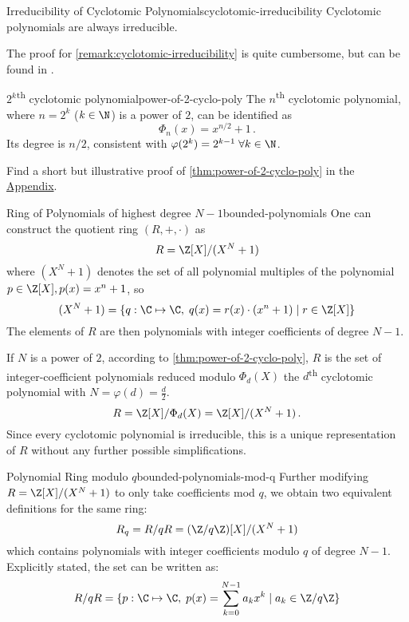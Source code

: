 \begin{remark}{Irreducibility of Cyclotomic Polynomials}{cyclotomic-irreducibility}
  Cyclotomic polynomials are always irreducible.
\end{remark}
The proof for \autoref{remark:cyclotomic-irreducibility} is quite cumbersome, but can be found in \cite{2002-serge-algebra}.

\begin{theorem}{$2^k$\textsuperscript{th} cyclotomic polynomial}{power-of-2-cyclo-poly}
  The $n$\textsuperscript{th} cyclotomic polynomial, where $n = 2^k$ ($k \in \N$) is a power of $2$,
  can be identified as
  $$\Phi_{n}(x) = x^{n/2} + 1\,.$$
  Its degree is $n/2$, consistent with $\varphi(2^k) = 2^{k-1} \; \forall k \in \N$.
\end{theorem}
Find a short but illustrative proof of \autoref{thm:power-of-2-cyclo-poly} in the \hyperref[chap:appendix]{Appendix}.

\begin{definition}{Ring of Polynomials of highest degree $N-1$}{bounded-polynomials}
  One can construct the quotient ring $(R, +, \cdot)$ as
  $$R = \Z[X] / (X^N + 1)$$
  where $(X^N + 1)$ denotes the set of all polynomial multiples of the polynomial $p \in \Z[X], p(x) = x^n + 1$, so
  $$(X^N+1) = \{q: \C \mapsto \C,\; q(x) = r(x) \cdot (x^n+1) \;|\; r \in \Z[X]\}$$
  The elements of $R$ are then polynomials with integer coefficients of degree $N-1$.
\end{definition}

If $N$ is a power of $2$, according to \autoref{thm:power-of-2-cyclo-poly},
$R$ is the set of integer-coefficient polynomials reduced modulo $\Phi_d(X)$
the $d$\textsuperscript{th} cyclotomic polynomial with $N = \varphi(d) = \frac{d}{2}$.
$$R = \Z[X] / \Phi_d(X) = \Z[X] / (X^N + 1)\,.$$
Since every cyclotomic polynomial is irreducible, this is a unique representation of $R$
without any further possible simplifications.

\begin{corollary}{Polynomial Ring modulo $q$}{bounded-polynomials-mod-q}
  Further modifying $R = \Z[X] / (X^N+1)$ to only take coefficients mod $q$, we obtain two equivalent definitions
  for the same ring:
  $$R_q = R/qR = (\Z/q\Z)[X] / (X^N+1)$$
  which contains polynomials with integer coefficients modulo $q$ of degree $N-1$.
  Explicitly stated, the set can be written as:
  $$R/qR = \{p: \C \mapsto \C,\; p(x) = \sum_{k=0}^{N-1} a_k x^k \;|\; a_k \in \Z/q\Z\}$$
\end{corollary}

